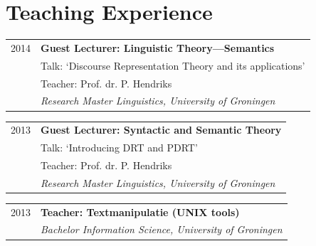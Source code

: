 \documentclass[a4paper,10pt]{article}
\def\leftcolwidth{.15\textwidth}
\def\tablevspace{10pt}
\begin{document}



\section*{Teaching Experience}

\noindent
\begin{tabularx}{\textwidth}{ p{\leftcolwidth} X }
  2014
  & \textbf{Guest Lecturer: Linguistic Theory---Semantics}\\
  & Talk: `Discourse Representation Theory and its applications'\\
  & Teacher: Prof. dr. P. Hendriks\\
  & \textit{Research Master Linguistics, University of Groningen}\\
\end{tabularx}

\vspace{\tablevspace}

\noindent
\begin{tabularx}{\textwidth}{ p{\leftcolwidth} X }
  2013
  & \textbf{Guest Lecturer: Syntactic and Semantic Theory}\\
  & Talk: `Introducing DRT and PDRT'\\
  & Teacher: Prof. dr. P. Hendriks\\
  & \textit{Research Master Linguistics, University of Groningen}\\
\end{tabularx}

\vspace{\tablevspace}

\noindent
\begin{tabularx}{\textwidth}{ p{\leftcolwidth} X }
  2013
  & \textbf{Teacher: Textmanipulatie (UNIX tools)}\\
  & \textit{Bachelor Information Science, University of Groningen}\\
\end{tabularx}
\end{document}
